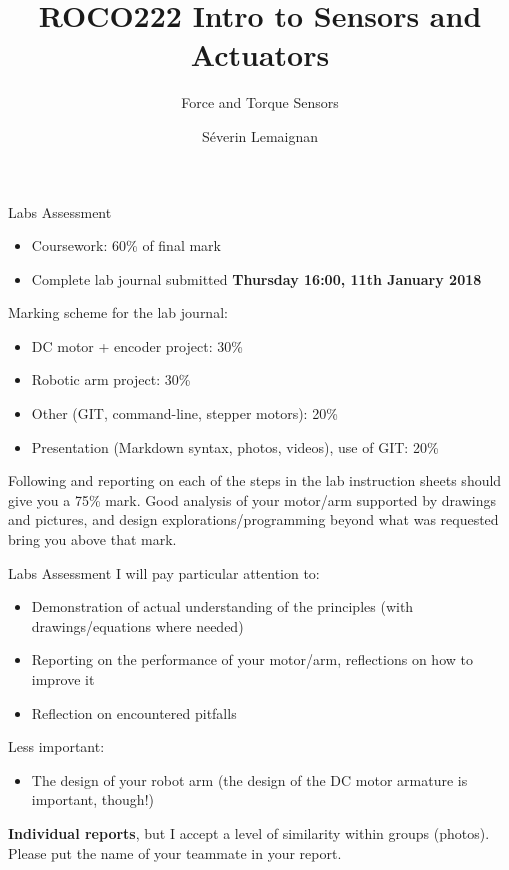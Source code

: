 \documentclass[compress]{beamer}
\title{ROCO222 \newline Intro to Sensors and Actuators}
\subtitle{Force and Torque Sensors}
\date{}
\author{Séverin Lemaignan}
\institute{Centre for Neural Systems and Robotics\\{\bf Plymouth University}}
\makeatletter
\def\beamer@writeslidentry@miniframesoff{%
  \expandafter\beamer@ifempty\expandafter{\beamer@framestartpage}{}%
  {%
    \clearpage\beamer@notesactions%
  }
}
\newcommand*{\miniframesoff}{\let\beamer@writeslidentry=\beamer@writeslidentry@miniframesoff}
\makeatother
\begin{document}

\maketitle

\miniframesoff

\begin{frame}{Labs Assessment}

    \begin{itemize}
        \item Coursework: 60\% of final mark
        \item Complete lab journal submitted \textbf{Thursday 16:00, 11th January 2018}
    \end{itemize}

    \pause

    Marking scheme for the lab journal:

    \begin{itemize}
        \item DC motor + encoder project: 30\%
        \item Robotic arm project: 30\%
        \item Other (GIT, command-line, stepper motors): 20\%
        \item Presentation (Markdown syntax, photos, videos), use of GIT: 20\%
    \end{itemize}

    Following and reporting on each of the steps in the lab instruction sheets
    should give you a 75\% mark. Good analysis of your motor/arm supported by
    drawings and pictures, and design explorations/programming beyond what was
    requested bring you above that mark.

\end{frame}

\begin{frame}{Labs Assessment}
    I will pay particular attention to:
    \begin{itemize}
        \item Demonstration of actual understanding of the principles
            (with drawings/equations where needed)
        \item Reporting on the performance of your motor/arm, reflections on how
            to improve it
        \item Reflection on encountered pitfalls
    \end{itemize}

    Less important:
    \begin{itemize}
        \item The design of your robot arm (the design of the DC motor armature
            is important, though!)
    \end{itemize}

    \textbf{Individual reports}, but I accept a level of similarity within
    groups (\eg photos). Please put the name of your teammate in your report.
\end{frame}
\end{document}
